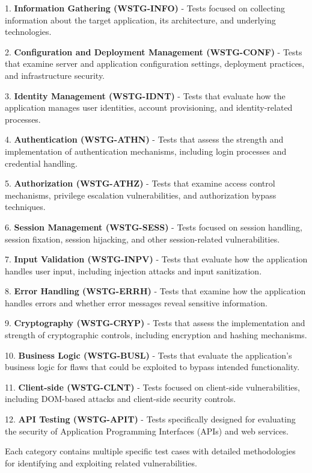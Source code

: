 \documentclass[12pt,a4paper]{article}
\begin{document}
1. \textbf{Information Gathering (WSTG-INFO)} - Tests focused on collecting information about the target application, its architecture, and underlying technologies.

2. \textbf{Configuration and Deployment Management (WSTG-CONF)} - Tests that examine server and application configuration settings, deployment practices, and infrastructure security.

3. \textbf{Identity Management (WSTG-IDNT)} - Tests that evaluate how the application manages user identities, account provisioning, and identity-related processes.

4. \textbf{Authentication (WSTG-ATHN)} - Tests that assess the strength and implementation of authentication mechanisms, including login processes and credential handling.

5. \textbf{Authorization (WSTG-ATHZ)} - Tests that examine access control mechanisms, privilege escalation vulnerabilities, and authorization bypass techniques.

6. \textbf{Session Management (WSTG-SESS)} - Tests focused on session handling, session fixation, session hijacking, and other session-related vulnerabilities.

7. \textbf{Input Validation (WSTG-INPV)} - Tests that evaluate how the application handles user input, including injection attacks and input sanitization.

8. \textbf{Error Handling (WSTG-ERRH)} - Tests that examine how the application handles errors and whether error messages reveal sensitive information.

9. \textbf{Cryptography (WSTG-CRYP)} - Tests that assess the implementation and strength of cryptographic controls, including encryption and hashing mechanisms.

10. \textbf{Business Logic (WSTG-BUSL)} - Tests that evaluate the application's business logic for flaws that could be exploited to bypass intended functionality.

11. \textbf{Client-side (WSTG-CLNT)} - Tests focused on client-side vulnerabilities, including DOM-based attacks and client-side security controls.

12. \textbf{API Testing (WSTG-APIT)} - Tests specifically designed for evaluating the security of Application Programming Interfaces (APIs) and web services.

Each category contains multiple specific test cases with detailed methodologies for identifying and exploiting related vulnerabilities.
\end{document}
